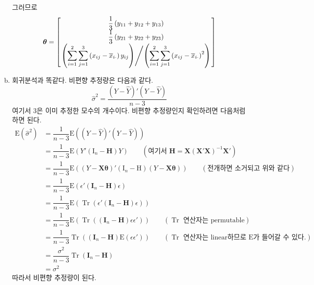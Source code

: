 \documentclass[answers]{exam}
\DeclareMathOperator{\Tr}{Tr}
\newcommand{\bs}{\boldsymbol}
\begin{document}
\begin{questions}
\begin{solution}
\begin{enumerate}[(a)]
\begin{equation}
      \end{equation}
      그러므로
      \begin{equation} 
        \bs{\theta} = \begin{bmatrix}\dfrac{1}{3}\left(y_{11}+y_{12}+y_{13}\right)\\\dfrac{1}{3}\left(y_{21}+y_{22}+y_{23}\right)\\ \left.\left(\displaystyle  \sum_{i=1}^{2}\sum_{j=1}^{3}\left(x_{ij}-\overline{x}_{i\cdot}\right)y_{ij}\right) \middle/\displaystyle \left(\sum_{i=1}^{2}\sum_{j=1}^{3}\left(x_{ij}-\overline{x}_{i\cdot}\right)^{2}\right)\right. \end{bmatrix}
      \end{equation}
      \item 회귀분석과 똑같다. 비편향 추정량은 다음과 같다.
      \begin{equation}
        \widehat{\sigma}^{2} = \dfrac{\left(Y-\widehat{Y}\right)'\left(Y-\widehat{Y}\right)}{n-3}
      \end{equation}
      여기서 3은 이미 추정한 모수의 개수이다. 비편향 추정량인지 확인하려면 다음처럼 하면 된다.
      \begin{align}
        \mathrm{E}\left(\widehat{\sigma}^{2}\right) &= \dfrac{1}{n-3}\mathrm{E}\left(\left(Y-\widehat{Y}\right)'\left(Y-\widehat{Y}\right)\right)\\
        &= \dfrac{1}{n-3}\mathrm{E}\left(Y'\left(\mathrm{I}_{n}-\mathbf{H}\right)Y\right)\qquad \left(\text{여기서 $\mathbf{H}=\mathbf{X}\left(\mathbf{X}'\mathbf{X}\right)^{-1}\mathbf{X}'$}\right)\\
        &= \dfrac{1}{n-3}\mathrm{E}\left(\left(Y-\mathbf{X}\bs{\theta}\right)'\left(\mathrm{I}_{n}-\mathrm{H}\right)\left(Y-\mathbf{X}\bs{\theta}\right)\right) \qquad \left(\text{전개하면 소거되고 위와 같다}\right)\\
        &= \dfrac{1}{n-3}\mathrm{E}\left(\epsilon'\left(\mathbf{I}_{n}-\mathbf{H}\right)\epsilon\right)\\
        &= \dfrac{1}{n-3}\mathrm{E}\left(\Tr\left(\epsilon'\left(\mathbf{I}_{n}-\mathbf{H}\right)\epsilon\right)\right)\\
        &= \dfrac{1}{n-3}\mathrm{E}\left(\Tr\left(\left(\mathbf{I}_{n}-\mathbf{H}\right)\epsilon\epsilon'\right)\right) \qquad \left(\text{$\Tr$ 연산자는 permutable}\right)\\
        &= \dfrac{1}{n-3}\Tr\left(\left(\mathbf{I}_{n}-\mathbf{H}\right)\mathrm{E}\left(\epsilon\epsilon'\right)\right) \qquad \left(\text{$\Tr$ 연산자는 linear하므로 $\mathrm{E}$가 들어갈 수 있다.}\right)\\
        &= \dfrac{\sigma^{2}}{n-3}\Tr\left(\mathbf{I}_{n}-\mathbf{H}\right)\\
        &= \sigma^{2}
      \end{align}
      따라서 비편향 추정량이 된다.
    \end{enumerate}
   \end{solution}
\end{questions}
\end{document}
